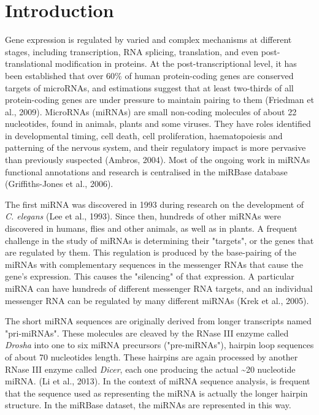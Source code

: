 \documentclass[nocrop]{bioinfo}
\begin{document}
\maketitle

\section{Introduction}

Gene expression is regulated by varied and complex mechanisms at different stages, including transcription, RNA splicing, translation, and even post-translational modification in proteins. At the post-transcriptional level, it has been established that over 60\% of human protein-coding genes are conserved targets of microRNAs, and estimations suggest that at least two-thirds of all protein-coding genes are under pressure to maintain pairing to them (Friedman et al., 2009). MicroRNAs (miRNAs) are small non-coding molecules of about 22 nucleotides, found in animals, plants and some viruses. They have roles identified in developmental timing, cell death, cell proliferation, haematopoiesis and patterning of the nervous system, and their regulatory impact is more pervasive than previously suspected (Ambros, 2004). Most of the ongoing work in miRNAs functional annotations and research is centralised in the miRBase database (Griffiths-Jones et al., 2006).

The first miRNA was discovered in 1993 during research on the development of \textit{C. elegans} (Lee et al., 1993). Since then, hundreds of other miRNAs were discovered in humans, flies and other animals, as well as in plants. A frequent challenge in the study of miRNAs is determining their "targets", or the genes that are regulated by them. This regulation is produced by the base-pairing of the miRNAs with complementary sequences in the messenger RNAs that cause the gene's expression. This causes the "silencing" of that expression. A particular miRNA can have hundreds of different messenger RNA targets, and an individual messenger RNA can be regulated by many different miRNAs (Krek et al., 2005).

The short miRNA sequences are originally derived from longer transcripts named "pri-miRNAs". These molecules are cleaved by the RNase III enzyme called \textit{Drosha} into one to six miRNA precursors ("pre-miRNAs"), hairpin loop sequences of about 70 nucleotides length. These hairpins are again processed by another RNase III enzyme called \textit{Dicer}, each one producing the actual \textasciitilde 20 nucleotide miRNA. (Li et al., 2013). In the context of miRNA sequence analysis, is frequent that the sequence used as representing the miRNA is actually the longer hairpin structure. In the miRBase dataset, the miRNAs are represented in this way.
\end{document}
